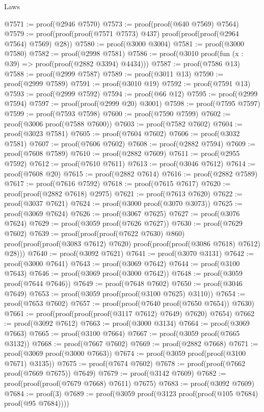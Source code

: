 \begin{lexlean}{Laws}
\begin{coremodule}
@7571 := proof(@2946 @7570)
@7573 := proof(proof(@640 @7569) @7564)
@7579 := proof(proof(proof(@7571 @7573) @437) proof(proof(proof(@2964 @7564) @7569) @28))
@7580 := proof(@3000 @3004)
@7581 := proof(@3000 @7580)
@7582 := proof(@2998 @7581)
@7586 := proof(@3010 proof(fun (x : @39) => proof(proof(@2882 @3394) @4434)))
@7587 := proof(@7586 @13)
@7588 := proof(@2999 @7587)
@7589 := proof(@3011 @13)
@7590 := proof(@2999 @7589)
@7591 := proof(@3010 @19)
@7592 := proof(@7591 @13)
@7593 := proof(@2999 @7592)
@7594 := proof(@66 @12)
@7595 := proof(@2999 @7594)
@7597 := proof(proof(@2999 @20) @3001)
@7598 := proof(@7595 @7597)
@7599 := proof(@7593 @7598)
@7600 := proof(@7590 @7599)
@7602 := proof(@3006 proof(@7588 @7600))
@7603 := proof(@7582 @7602)
@7604 := proof(@3023 @7581)
@7605 := proof(@7604 @7602)
@7606 := proof(@3032 @7581)
@7607 := proof(@7606 @7602)
@7608 := proof(@2882 @7594)
@7609 := proof(@7608 @7589)
@7610 := proof(@2882 @7609)
@7611 := proof(@2955 @7592)
@7612 := proof(@7610 @7611)
@7613 := proof(@3046 @7612)
@7614 := proof(@7608 @20)
@7615 := proof(@2882 @7614)
@7616 := proof(@2882 @7589)
@7617 := proof(@7616 @7592)
@7618 := proof(@7615 @7617)
@7620 := proof(proof(@2882 @7618) @2975)
@7621 := proof(@7613 @7620)
@7622 := proof(@3037 @7621)
@7624 := proof(@3000 proof(@3070 @3073))
@7625 := proof(@3069 @7624)
@7626 := proof(@3067 @7625)
@7627 := proof(@3076 @7624)
@7629 := proof(@3059 proof(@7626 @7627))
@7630 := proof(@7629 @7602)
@7639 := proof(proof(proof(@7622 @7630) @860)
      proof(proof(proof(@3083 @7612) @7620) proof(proof(proof(@3086 @7618) @7612) @28)))
@7640 := proof(@3092 @7621)
@7641 := proof(@3070 @3131)
@7642 := proof(@3000 @7641)
@7643 := proof(@3069 @7642)
@7644 := proof(@3100 @7643)
@7646 := proof(@3069 proof(@3000 @7642))
@7648 := proof(@3059 proof(@7644 @7646))
@7649 := proof(@7648 @7602)
@7650 := proof(@3046 @7649)
@7653 := proof(@3059 proof(proof(@3100 @7625) @3110))
@7654 := proof(@7653 @7602)
@7657 := proof(proof(@7640 proof(@7650 @7654)) @7630)
@7661 := proof(proof(proof(proof(@3117 @7612) @7649) @7620) @7654)
@7662 := proof(@3092 @7612)
@7663 := proof(@3000 @3134)
@7664 := proof(@3069 @7663)
@7665 := proof(@3100 @7664)
@7667 := proof(@3059 proof(@7665 @3132))
@7668 := proof(@7667 @7602)
@7669 := proof(@2882 @7668)
@7671 := proof(@3069 proof(@3000 @7663))
@7674 := proof(@3059 proof(proof(@3100 @7671) @3135))
@7675 := proof(@7674 @7602)
@7678 := proof(proof(@7662 proof(@7669 @7675)) @7649)
@7679 := proof(@3142 @7609)
@7682 := proof(proof(proof(@7679 @7668) @7611) @7675)
@7683 := proof(@3092 @7609)
@7684 := proof(3)
@7689 := proof(@3059 proof(@3123 proof(proof(@105 @7684) proof(@95 @7684))))

\end{coremodule}
\end{lexlean}
